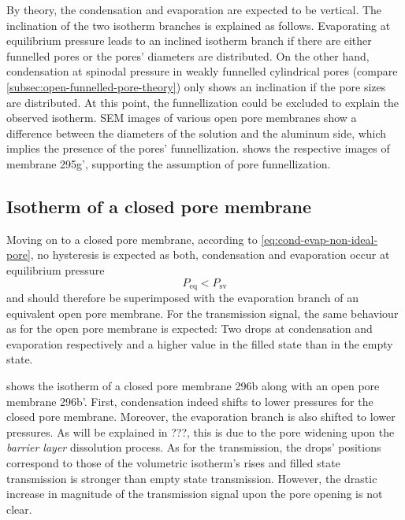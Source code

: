 \documentclass[../thesis.tex]{subfiles}
\begin{document}
        By theory, the condensation and evaporation are expected to be vertical. The inclination of the two isotherm branches is explained as follows. Evaporating at equilibrium pressure leads to an inclined isotherm branch if there are either funnelled pores or the pores' diameters are distributed. On the other hand, condensation at spinodal pressure in weakly funnelled cylindrical pores (compare \cref{subsec:open-funnelled-pore-theory}) only shows an inclination if the pore sizes are distributed. At this point, the funnellization could be excluded to explain the observed isotherm. SEM images of various open pore membranes show a difference between the diameters of the solution and the aluminum side, which implies the presence of the pores' funnellization.  shows the respective images of membrane 295g', supporting the assumption of pore funnellization.



    \subsection{Isotherm of a closed pore membrane}
    \label{subsec:closed-pore-isotherm}

        Moving on to a closed pore membrane, according to \cref{eq:cond-evap-non-ideal-pore}, no hysteresis is expected as both, condensation and evaporation occur at equilibrium pressure
        \begin{equation*}
          P_\mathrm{eq}<P_\mathrm{sv}
        \end{equation*}
        and should therefore be superimposed with the evaporation branch of an equivalent open pore membrane. For the transmission signal, the same behaviour as for the open pore membrane is expected: Two drops at condensation and evaporation respectively and a higher value in the filled state than in the empty state.

         shows the isotherm of a closed pore membrane 296b along with an open pore membrane 296b'. First, condensation indeed shifts to lower pressures for the closed pore membrane. Moreover, the evaporation branch is also shifted to lower pressures. As will be explained in ???, this is due to the pore widening upon the \textit{barrier layer} dissolution process. As for the transmission, the drops' positions correspond to those of the volumetric isotherm's rises and filled state transmission is stronger than empty state transmission. However, the drastic increase in magnitude of the transmission signal upon the pore opening is not clear.
        \medskip
\end{document}
